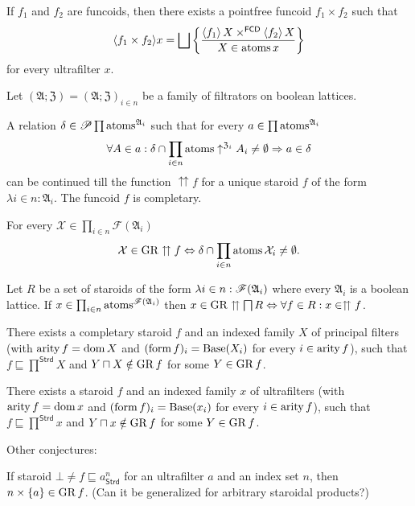 \begin{conjecture}
If $f_{1}$ and $f_{2}$ are funcoids, then there exists a pointfree
funcoid $f_{1}\times f_{2}$ such that 
\[
\langle f_{1}\times f_{2}\rangle x=\bigsqcup\left\{ \frac{\left\langle f_{1}\right\rangle X\times^{\mathsf{FCD}}\left\langle f_{2}\right\rangle X}{X\in\operatorname{atoms} x}\right\}
\]
for every ultrafilter $x$.
\end{conjecture}

\begin{conjecture}
Let $(\mathfrak{A};\mathfrak{Z})=(\mathfrak{A};\mathfrak{Z})_{i\in n}$
be a family of filtrators on boolean lattices.

A relation $\delta\in\mathscr{P}\prod\operatorname{atoms}^{\mathfrak{A}_{i}}$ such
that for every $a\in\prod\operatorname{atoms}^{\mathfrak{A}_{i}}$ 
\begin{equation}
\forall A\in a:\delta\cap\prod_{i\in n}\operatorname{atoms}\uparrow^{\mathfrak{Z}_{i}}A_{i}\neq\emptyset\Rightarrow a\in\delta\label{m-for-atoms}
\end{equation}
can be continued till the function $\upuparrows f$ for a unique staroid
$f$ of the form $\lambda i\in n:\mathfrak{A}_{i}$. The funcoid $f$
is completary.
\end{conjecture}

\begin{conjecture}
For every $\mathcal{X}\in\prod_{i\in n}\mathscr{F}(\mathfrak{A}_{i})$
\begin{equation}
\mathcal{X}\in\operatorname{GR}\upuparrows f\Leftrightarrow\delta\cap\prod_{i\in n}\operatorname{atoms}\mathcal{X}_{i}\neq\emptyset.\label{m-ast-atoms}
\end{equation}

\end{conjecture}

\begin{conjecture}
Let $R$ be a set of staroids of the form $\lambda i\in n:\mathscr{F}(\mathfrak{A}_{i})$
where every $\mathfrak{A}_{i}$ is a boolean lattice. If $x\in\prod_{i\in n}\operatorname{atoms}^{\mathscr{F}(\mathfrak{A}_{i})}$
then $x\in\operatorname{GR}\upuparrows\bigsqcap R\Leftrightarrow\forall f\in R:x\in\upuparrows f$.

There exists a completary staroid $f$ and an indexed family $X$
of principal filters (with $\operatorname{arity} f=\operatorname{dom} X$ and $(\operatorname{form} f)_{i}=\operatorname{Base}(X_{i})$
for every $i\in\operatorname{arity} f$), such that $f\sqsubseteq\prod^{\mathsf{Strd}}X$
and $Y\sqcap X\notin\operatorname{GR} f$ for some $Y\in\operatorname{GR} f$.
\end{conjecture}

\begin{conjecture}
There exists a staroid $f$ and an indexed family $x$ of ultrafilters
(with $\operatorname{arity} f=\operatorname{dom} x$ and $(\operatorname{form} f)_{i}=\operatorname{Base}(x_{i})$ for every
$i\in\operatorname{arity} f$), such that $f\sqsubseteq\prod^{\mathsf{Strd}}x$
and $Y\sqcap x\notin\operatorname{GR} f$ for some $Y\in\operatorname{GR} f$.
\end{conjecture}
Other conjectures:
\begin{conjecture}
If staroid $\bot\neq f\sqsubseteq a_{\mathsf{Strd}}^{n}$ for an ultrafilter
$a$ and an index set $n$, then $n\times\{a\}\in\operatorname{GR} f$. (Can it
be generalized for arbitrary staroidal products?)
\end{conjecture}

